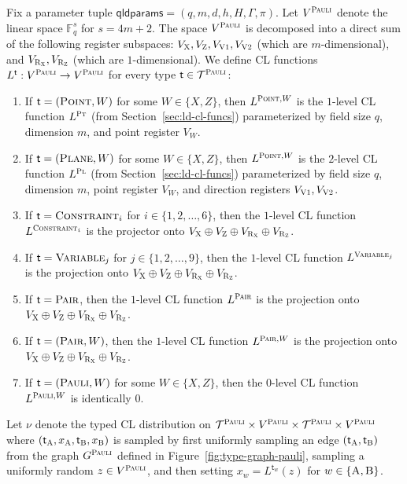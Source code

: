\documentclass[11pt]{article}
\theoremstyle{definition}
\newcommand{\F}{\ensuremath{\mathbb{F}}}
\newcommand{\type}{\mathcal{T}}
\newcommand{\gamestyle}[1]{\ensuremath{\textsc{#1}}\xspace}
\newcommand{\pauli}{\gamestyle{Pauli}}
\newcommand{\labelstyle}[1]{\ensuremath{\textsc{#1}}\xspace}
\newcommand{\xpt}{\labelstyle{X}}
\newcommand{\zpt}{\labelstyle{Z}}
\newcommand{\rxpt}{\labelstyle{R}_\xpt}
\newcommand{\rzpt}{\labelstyle{R}_\zpt}
\newcommand{\dir}[1]{\labelstyle{V#1}}
\newcommand{\plf}{\labelstyle{Pl}}
\newcommand{\ptf}{\labelstyle{Pt}}
\newcommand{\tvarstyle}[1]{\mathsf{#1}}
\newcommand{\tvar}{\ensuremath{\tvarstyle{t}}}
\newcommand{\alice}{\labelstyle{A}}
\newcommand{\bob}{\labelstyle{B}}
\newcommand{\typestyle}[1]{\ensuremath{\textsc{#1}}\xspace}
\newcommand{\Plane}{\typestyle{Plane}}
\newcommand{\Point}{\typestyle{Point}}
\newcommand{\Pair}{\typestyle{Pair}}
\newcommand{\Constraint}{\typestyle{Constraint}}
\newcommand{\Variable}{\typestyle{Variable}}
\newcommand{\Pauli}{\typestyle{Pauli}}
\newcommand{\AB}{\{\alice, \bob\}}
\newcommand{\qldparams}{\mathsf{qldparams}}
\begin{document}
Fix a parameter tuple $\qldparams = (q,m,d,h,H,\Gamma,\pi)$.
Let $V^\pauli$ denote the linear space $\F_q^s$ for $s = 4m + 2$.
The space $V^\pauli$ is decomposed into a direct sum of the following register
subspaces: $V_\xpt,V_\zpt,V_{\dir{1}},V_{\dir{2}}$ (which are $m$-dimensional),
and $V_{\rxpt},V_{\rzpt}$ (which are $1$-dimensional).
We define CL functions $L^\tvar: V^\pauli \to V^\pauli$ for every type $\tvar
\in \type^\pauli$:
\begin{enumerate}
\item If $\tvar = (\Point,W)$ for some $W \in \{X,Z\}$, then $L^{\Point,W}$ is
  the $1$-level CL function $L^\ptf$ (from Section~\ref{sec:ld-cl-funcs})
  parameterized by field size $q$, dimension $m$, and point register
  $V_W$.%

\item If $\tvar = (\Plane,W)$ for some $W \in \{X,Z\}$, then $L^{\Point,W}$ is
  the $2$-level CL function $L^\plf$ (from Section~\ref{sec:ld-cl-funcs})
  parameterized by field size $q$, dimension $m$, point register $V_W$, and
  direction registers $V_{\dir{1}},V_{\dir{2}}$.

\item If $\tvar = \Constraint_i$ for $i \in \{1, 2, \ldots, 6\}$, then the
  $1$-level CL function $L^{\Constraint_i}$ is the projector onto $V_\xpt \oplus
  V_\zpt \oplus V_{\rxpt} \oplus V_{\rzpt}$.
	
\item If $\tvar = \Variable_j$ for $j \in \{1,2,\ldots,9\}$, then the $1$-level
  CL function $L^{\Variable_j}$ is the projection onto $V_\xpt \oplus V_\zpt
  \oplus V_{\rxpt} \oplus V_{\rzpt}$.
	
\item If $\tvar = \Pair$, then the $1$-level CL function $L^{\Pair}$ is the
  projection onto $V_\xpt \oplus V_\zpt \oplus V_{\rxpt} \oplus V_{\rzpt}$.
  
 \item If $\tvar = (\Pair,W)$, then the $1$-level CL function $L^{\Pair,W}$ is the
  projection onto $V_\xpt \oplus V_\zpt \oplus V_{\rxpt} \oplus V_{\rzpt}$.

\item If $\tvar = (\Pauli,W)$ for some $W \in \{X,Z\}$, then the $0$-level CL
  function $L^{\Pauli,W}$ is identically $0$.
\end{enumerate}

Let $\nu$ denote the typed CL distribution on $\type^\pauli \times V^\pauli
\times \type^\pauli \times V^\pauli$ where
$(\tvar_\alice,x_\alice,\tvar_\bob,x_\bob)$ is sampled by first uniformly
sampling an edge $(\tvar_\alice,\tvar_\bob)$ from the graph $G^\pauli$ defined
in Figure~\ref{fig:type-graph-pauli}, sampling a uniformly random $z \in
V^\pauli$, and then setting $x_w = L^{\tvar_w}(z)$ for $w \in \AB$.
\end{document}
